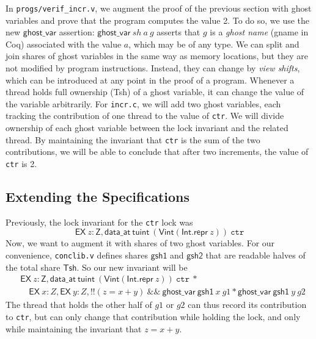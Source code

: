 \documentclass[11pt]{article}
\begin{document}
In \texttt{progs/verif\_incr.v}, we augment the proof of the previous section with ghost variables and prove that the program computes the value 2. To do so, we use the new $\mathsf{ghost\_var}$ assertion: $\mathsf{ghost\_var}\ \mathit{sh}\ a\ g$ asserts that $g$ is a \emph{ghost name} (\textsf{gname} in Coq) associated with the value $a$, which may be of any type. We can split and join shares of ghost variables in the same way as memory locations, but they are not modified by program instructions. Instead, they can change by \emph{view shifts}, which can be introduced at any point in the proof of a program. Whenever a thread holds full ownership (\textsf{Tsh}) of a ghost variable, it can change the value of the variable arbitrarily. For \texttt{incr.c}, we will add two ghost variables, each tracking the contribution of one thread to the value of \texttt{ctr}. We will divide ownership of each ghost variable between the lock invariant and the related thread. By maintaining the invariant that \texttt{ctr} is the sum of the two contributions, we will be able to conclude that after two increments, the value of \texttt{ctr} is 2.

\subsection{Extending the Specifications}
Previously, the lock invariant for the \texttt{ctr} lock was $$\mathsf{EX}\ z : \mathsf{Z}, \mathsf{data\_at}\ \mathsf{tuint}\ (\mathsf{Vint} (\mathsf{Int.repr}\ z))\ \texttt{ctr}$$
Now, we want to augment it with shares of two ghost variables. For our convenience, \texttt{conclib.v} defines shares $\mathsf{gsh1}$ and $\mathsf{gsh2}$ that are readable halves of the total share $\mathsf{Tsh}$. So our new invariant will be
\begin{align*}&\mathsf{EX}\ z : \mathsf{Z}, \mathsf{data\_at}\ \mathsf{tuint}\ (\mathsf{Vint} (\mathsf{Int.repr}\ z))\ \texttt{ctr}\ * \\&\quad\mathsf{EX}\ x : Z, \mathsf{EX}\ y : Z, !!(z = x + y) \ \&\&\ \mathsf{ghost\_var}\ \mathsf{gsh1}\ x\ g1 * \mathsf{ghost\_var}\ \mathsf{gsh1}\ y\ g2\end{align*}
The thread that holds the other half of $g1$ or $g2$ can thus record its contribution to \texttt{ctr}, but can only change that contribution while holding the lock, and only while maintaining the invariant that $z = x + y$.
\end{document}
